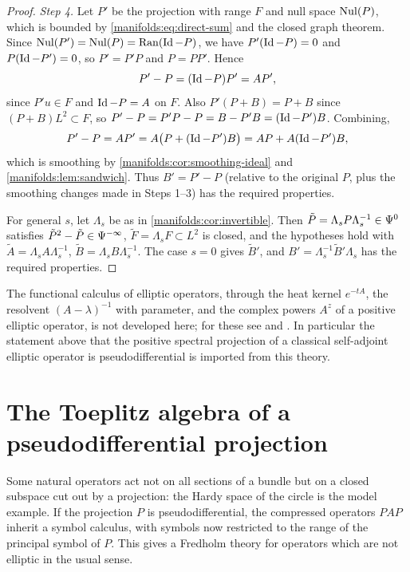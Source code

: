 \begin{proof}
\emph{Step 4.} Let $P'$ be the projection with range $F$ and null space $\operatorname{Nul}(P)$, which is
bounded by \eqref{manifolds:eq:direct-sum} and the closed graph theorem. Since
$\operatorname{Nul}(P')=\operatorname{Nul}(P)=\operatorname{Ran}(\operatorname{Id}-P)$, we have $P'(\operatorname{Id}-P)=0$ and $P(\operatorname{Id}-P')=0$, so $P'=P'P$ and
$P=PP'$. Hence
\begin{equation*}
P'-P=(\operatorname{Id}-P)P'=AP',
\end{equation*}
since $P'u\in F$ and $\operatorname{Id}-P=A$ on $F$. Also $P'(P+B)=P+B$ since $(P+B)L^2\subset F$, so
$P'-P=P'P-P=B-P'B=(\operatorname{Id}-P')B$. Combining,
\begin{equation*}
P'-P=AP'=A\big(P+(\operatorname{Id}-P')B\big)=AP+A(\operatorname{Id}-P')B,
\end{equation*}
which is smoothing by \cref{manifolds:cor:smoothing-ideal} and \cref{manifolds:lem:sandwich}.
Thus $B'=P'-P$ (relative to the original $P$, plus the smoothing changes made in
Steps 1--3) has the required properties.

For general $s$, let $\Lambda_s$ be as in \cref{manifolds:cor:invertible}. Then
$\tilde P=\Lambda_sP\Lambda_s^{-1}\in\Psi^{0}$ satisfies $\tilde P^2-\tilde P\in\Psi^{-\infty}$,
$\tilde F=\Lambda_sF\subset L^2$ is closed, and the hypotheses hold with $\tilde A=\Lambda_sA\Lambda_s^{-1}$,
$\tilde B=\Lambda_sB\Lambda_s^{-1}$. The case $s=0$ gives $\tilde B'$, and
$B'=\Lambda_s^{-1}\tilde B'\Lambda_s$ has the required properties.
\end{proof}

\begin{remark}\label{manifolds:rem:functional-calculus}
The functional calculus of elliptic operators, through the heat kernel
$e^{-tA}$, the resolvent $(A-\lambda)^{-1}$ with parameter, and the complex powers $A^z$
of a positive elliptic operator, is not developed here; for these see
\cite{Seeley} and \cite{Shubin}. In particular the statement above that the positive
spectral projection of a classical self-adjoint elliptic operator is pseudodifferential
is imported from this theory.
\end{remark}

\section{The Toeplitz algebra of a pseudodifferential projection}\label{manifolds:sec:toeplitz}
Some natural operators act not on all sections of a bundle but on a closed
subspace cut out by a projection: the Hardy space of the circle is the model
example. If the projection $P$ is pseudodifferential, the compressed operators
$PAP$ inherit a symbol calculus, with symbols now restricted to the range of
the principal symbol of $P$. This gives a Fredholm theory for operators which
are not elliptic in the usual sense.

